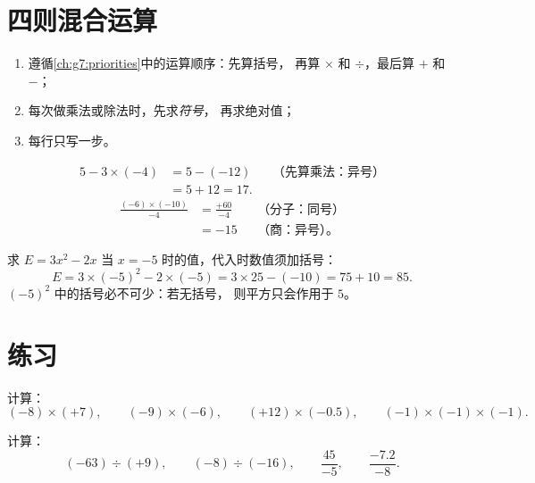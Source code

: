 \section{四则混合运算}

\begin{method}[正负数计算的稳妥方法]\label{met:g8:negprod:compute}
\begin{enumerate}
  \item 遵循\cref{ch:g7:priorities}中的运算顺序：先算括号，
        再算 $\times$ 和 $\div$，最后算 $+$ 和 $-$；
  \item 每次做乘法或除法时，先求\emph{符号}，
        再求绝对值；
  \item 每行只写一步。
\end{enumerate}
\end{method}

\begin{example}\label{ex:g8:negprod:compute}
\begin{align*}
5 - 3 \times (-4)
&= 5 - (-12) && \text{（先算乘法：异号）}\\
&= 5 + 12 = 17 .
\end{align*}
\begin{align*}
\frac{(-6) \times (-10)}{-4}
&= \frac{+60}{-4} && \text{（分子：同号）}\\
&= -15 && \text{（商：异号）。}
\end{align*}
\end{example}

\begin{example}[代入负数求值]\label{ex:g8:negprod:substitute}
求 $E = 3x^2 - 2x$ 当 $x = -5$ 时的值，代入时数值须加括号：
\[
E = 3 \times (-5)^2 - 2 \times (-5)
= 3 \times 25 - (-10)
= 75 + 10 = 85 .
\]
$(-5)^2$ 中的括号必不可少：若无括号，
则平方只会作用于 $5$。
\end{example}

\section{练习}

\begin{exercise}[$\star$]\label{exo:g8:negprod:1}
计算：
\[
(-8) \times (+7), \qquad
(-9) \times (-6), \qquad
(+12) \times (-0.5), \qquad
(-1) \times (-1) \times (-1).
\]
\end{exercise}

\begin{exercise}[$\star$]\label{exo:g8:negprod:2}
计算：
\[
(-63) \div (+9), \qquad
(-8) \div (-16), \qquad
\frac{45}{-5}, \qquad
\frac{-7.2}{-8} .
\]
\end{exercise}

